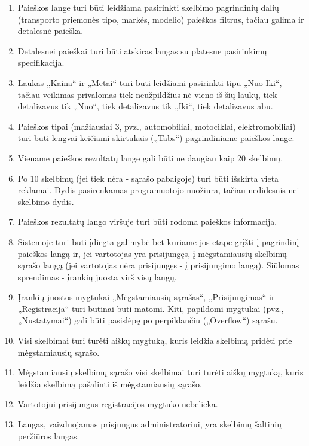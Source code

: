 \documentclass[12pt]{article}
\begin{document}
\begin{enumerate}[labelindent=10pt,leftmargin=2.2cm]
		\item Paieškos lange turi būti leidžiama pasirinkti skelbimo pagrindinių dalių (transporto priemonės tipo, markės, modelio) paieškos filtrus, tačiau galima ir detalesnė paieška.
		\item Detalesnei paieškai turi būti atskiras langas su platesne pasirinkimų specifikacija.
		\item Laukas „Kaina“ ir „Metai“ turi būti leidžiami pasirinkti tipu „Nuo-Iki“, tačiau veikimas privalomas tiek neužpildžius nė vieno iš šių laukų, tiek detalizavus tik „Nuo“, tiek detalizavus tik „Iki“, tiek detalizavus abu.
		\item Paieškos tipai (mažiausiai 3, pvz., automobiliai, motociklai, elektromobiliai) turi būti lengvai keičiami skirtukais („Tabs“) pagrindiniame paieškos lange.
		\item Viename paieškos rezultatų lange gali būti ne daugiau kaip 20 skelbimų.
		\item Po 10 skelbimų (jei tiek nėra - sąrašo pabaigoje) turi būti išskirta vieta reklamai. Dydis pasirenkamas programuotojo nuožiūra, tačiau nedidesnis nei skelbimo dydis.
		\item Paieškos rezultatų lango viršuje turi būti rodoma paieškos informacija.
		\item Sistemoje turi būti įdiegta galimybė bet kuriame jos etape grįžti į pagrindinį paieškos langą ir, jei vartotojas yra prisijungęs, į mėgstamiausių skelbimų sąrašo langą (jei vartotojas nėra prisijungęs - į prisijungimo langą). Siūlomas sprendimas - įrankių juosta virš visų langų.
		\item Įrankių juostos mygtukai „Mėgstamiausių sąrašas“, „Prisijungimas“ ir „Registracija“ turi būtinai būti matomi. Kiti, papildomi mygtukai (pvz., „Nustatymai“) gali būti pasislėpę po perpildančiu („Overflow“) sąrašu.
		\item Visi skelbimai turi turėti aiškų mygtuką, kuris leidžia skelbimą pridėti prie mėgstamiausių sąrašo.
		\item Mėgstamiausių skelbimų sąrašo visi skelbimai turi turėti aiškų mygtuką, kuris leidžia skelbimą pašalinti iš mėgstamiausių sąrašo.
		\item Vartotojui prisijungus registracijos mygtuko nebelieka.
		\item Langas, vaizduojamas prisjungus administratoriui, yra skelbimų šaltinių peržiūros langas. 
	\end{enumerate}
		
\end{document}
